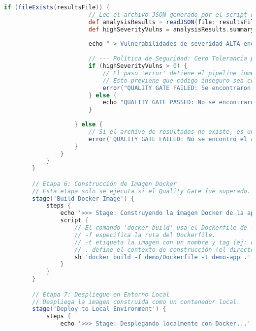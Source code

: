 \begin{lstlisting}[language=groovy, caption={Estructura completa del Jenkinsfile.}, label={lst:jenkinsfile}]
                    if (fileExists(resultsFile)) {
                        // Lee el archivo JSON generado por el script de IA.
                        def analysisResults = readJSON(file: resultsFile)
                        def highSeverityVulns = analysisResults.summary.high_severity_vulnerabilities
                        
                        echo "-> Vulnerabilidades de severidad ALTA encontradas: ${highSeverityVulns}"
                        
                        // --- Política de Seguridad: Cero Tolerancia para Vulnerabilidades Altas ---
                        if (highSeverityVulns > 0) {
                            // El paso 'error' detiene el pipeline inmediatamente y lo marca como FAILURE.
                            // Esto previene que código inseguro sea construido o desplegado.
                            error("QUALITY GATE FAILED: Se encontraron ${highSeverityVulns} vulnerabilidades de severidad ALTA. Abortando el pipeline.")
                        } else {
                            echo "QUALITY GATE PASSED: No se encontraron vulnerabilidades de severidad ALTA."
                        }
                        
                    } else {
                        // Si el archivo de resultados no existe, es un fallo crítico del proceso de análisis.
                        error("QUALITY GATE FAILED: No se encontró el archivo de resultados '${resultsFile}'. No se puede verificar la calidad.")
                    }
                }
            }
        }

        // Etapa 6: Construcción de Imagen Docker
        // Esta etapa solo se ejecuta si el Quality Gate fue superado.
        stage('Build Docker Image') {
            steps {
                echo '>>> Stage: Construyendo la imagen Docker de la aplicación...'
                script {
                    // El comando 'docker build' usa el Dockerfile de la aplicación.
                    // -f especifica la ruta del Dockerfile.
                    // -t etiqueta la imagen con un nombre y tag (ej: demo-app:latest).
                    // . define el contexto de construcción (el directorio actual).
                    sh 'docker build -f demo/Dockerfile -t demo-app .'
                }
            }
        }

        // Etapa 7: Despliegue en Entorno Local
        // Despliega la imagen construida como un contenedor local.
        stage('Deploy to Local Environment') {
            steps {
                echo '>>> Stage: Desplegando localmente con Docker...'
                

\end{lstlisting}
